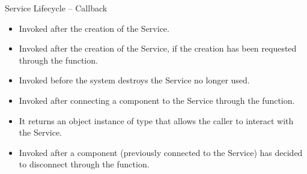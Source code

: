 \documentclass{beamer}
\begin{document}
  \begin{frame}[allowframebreaks]{Service Lifecycle -- Callback}
    \begin{block}{}
      \begin{itemize}
        \item Invoked after the creation of the Service. 
      \end{itemize}
    \end{block}

    \begin{block}{}
      \begin{itemize}
        \item Invoked after the creation of the Service, if the creation has
        been requested through the  function.
      \end{itemize}
    \end{block}

    \begin{block}{}
      \begin{itemize}
        \item Invoked before the system destroys the Service no longer used.
      \end{itemize}
    \end{block}

  \framebreak

    \begin{block}{}
      \begin{itemize}
        \item Invoked after connecting a component to the Service through the
         function.
        \item It returns an object instance of type  that allows
        the caller to interact with the Service.
      \end{itemize}
    \end{block}

    \begin{block}{}
      \begin{itemize}
        \item Invoked after a component (previously connected to the Service)
        has decided to disconnect through the  function.
      \end{itemize}
    \end{block}
  \end{frame}
\end{document}

